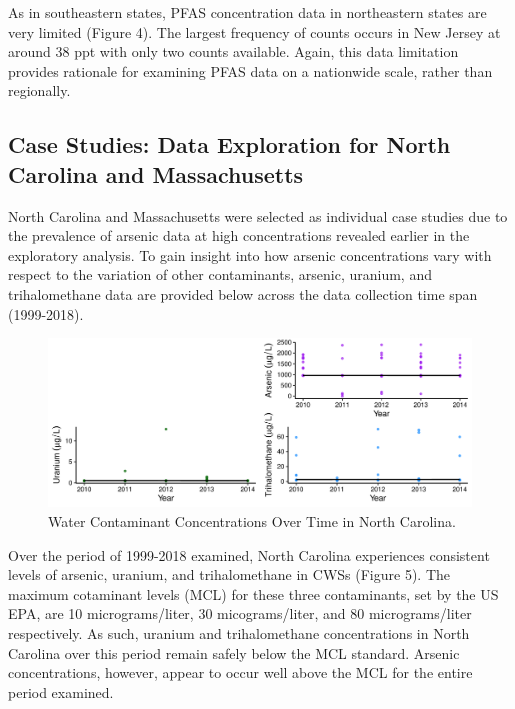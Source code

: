\documentclass[12pt,]{article}
\begin{document}
As in southeastern states, PFAS concentration data in northeastern
states are very limited (Figure 4). The largest frequency of counts
occurs in New Jersey at around 38 ppt with only two counts available.
Again, this data limitation provides rationale for examining PFAS data
on a nationwide scale, rather than regionally.

\newpage

\hypertarget{case-studies-data-exploration-for-north-carolina-and-massachusetts}{%
\subsection{Case Studies: Data Exploration for North Carolina and
Massachusetts}\label{case-studies-data-exploration-for-north-carolina-and-massachusetts}}

North Carolina and Massachusetts were selected as individual case
studies due to the prevalence of arsenic data at high concentrations
revealed earlier in the exploratory analysis. To gain insight into how
arsenic concentrations vary with respect to the variation of other
contaminants, arsenic, uranium, and trihalomethane data are provided
below across the data collection time span (1999-2018).

\begin{figure}
\centering
\includegraphics{Project_Template_files/figure-latex/figs5-1.pdf}
\caption{Water Contaminant Concentrations Over Time in North Carolina.}
\end{figure}

Over the period of 1999-2018 examined, North Carolina experiences
consistent levels of arsenic, uranium, and trihalomethane in CWSs
(Figure 5). The maximum cotaminant levels (MCL) for these three
contaminants, set by the US EPA, are 10 micrograms/liter, 30
micograms/liter, and 80 micrograms/liter respectively. As such, uranium
and trihalomethane concentrations in North Carolina over this period
remain safely below the MCL standard. Arsenic concentrations, however,
appear to occur well above the MCL for the entire period examined.
\end{document}
